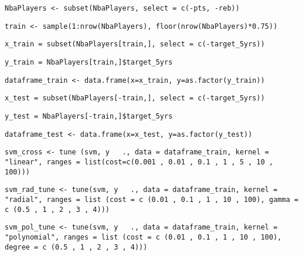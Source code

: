 \begin{center}
\texttt{NbaPlayers <- subset(NbaPlayers, select = c(-pts, -reb))}

\texttt{train <- sample(1:nrow(NbaPlayers), floor(nrow(NbaPlayers)*0.75))}

\texttt{x\_train = subset(NbaPlayers[train,], select = c(-target\_5yrs))}

\texttt{y\_train = NbaPlayers[train,]\$target\_5yrs}

\texttt{dataframe\_train <- data.frame(x=x\_train, y=as.factor(y\_train))}

\texttt{x\_test = subset(NbaPlayers[-train,], select = c(-target\_5yrs))}

\texttt{y\_test = NbaPlayers[-train,]\$target\_5yrs}

\texttt{dataframe\_test <- data.frame(x=x\_test, y=as.factor(y\_test))}

\texttt{svm\_cross <- tune (svm, y ~ ., data = dataframe\_train, kernel = "linear",
ranges = list(cost=c(0.001 , 0.01 , 0.1 , 1 , 5 , 10 , 100)))}

\texttt{svm\_rad\_tune <- tune(svm, y ~ ., data = dataframe\_train, kernel = "radial", ranges = list (cost = c (0.01 , 0.1 , 1 , 10 , 100), gamma = c (0.5 , 1 , 2 , 3 , 4)))}

\texttt{svm\_pol\_tune <- tune(svm, y ~ ., data = dataframe\_train, kernel = "polynomial", ranges = list (cost = c (0.01 , 0.1 , 1 , 10 , 100), degree = c (0.5 , 1 , 2 , 3 , 4)))}
\end{center}